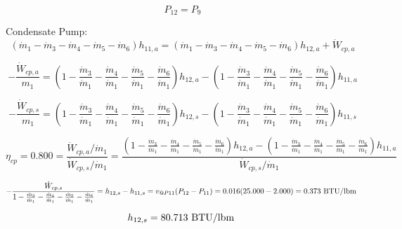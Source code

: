 \documentclass{article}
\begin{document}
\begin{equation}
P_{12} = P_{ 9}
\end{equation}


Condensate Pump:
\begin{equation}
(\dot{m}_{ 1} - \dot{m}_{ 3} - \dot{m}_{ 4} - \dot{m}_{ 5} - \dot{m}_{ 6})h_{11,a} = (\dot{m}_{ 1} - \dot{m}_{ 3} - \dot{m}_{ 4} - \dot{m}_{ 5} - \dot{m}_{ 6})h_{12,a} + \dot{W}_{cp ,a}
\end{equation}

\begin{equation}
-\frac{\dot{W}_{cp ,a}}{m_1} = (1 - \frac{\dot{m}_{ 3}}{\dot{m}_{ 1}} - \frac{\dot{m}_{ 4}}{\dot{m}_{ 1}} - \frac{\dot{m}_{ 5}}{\dot{m}_{ 1}} - \frac{\dot{m}_{ 6}}{\dot{m}_{ 1}})h_{12,a} - (1 - \frac{\dot{m}_{ 3}}{\dot{m}_{ 1}} - \frac{\dot{m}_{ 4}}{\dot{m}_{ 1}} - \frac{\dot{m}_{ 5}}{\dot{m}_{ 1}} - \frac{\dot{m}_{ 6}}{\dot{m}_{ 1}})h_{11,a}\end{equation}

\begin{equation}
-\frac{\dot{W}_{cp ,s}}{m_1} = (1 - \frac{\dot{m}_{ 3}}{\dot{m}_{ 1}} - \frac{\dot{m}_{ 4}}{\dot{m}_{ 1}} - \frac{\dot{m}_{ 5}}{\dot{m}_{ 1}} - \frac{\dot{m}_{ 6}}{\dot{m}_{ 1}})h_{12,s} - (1 - \frac{\dot{m}_{ 3}}{\dot{m}_{ 1}} - \frac{\dot{m}_{ 4}}{\dot{m}_{ 1}} - \frac{\dot{m}_{ 5}}{\dot{m}_{ 1}} - \frac{\dot{m}_{ 6}}{\dot{m}_{ 1}})h_{11,s}\end{equation}

\begin{equation}
\eta_{cp } =    0.800 = \frac{\dot{W}_{cp ,a} / \dot{m}_{1}}{\dot{W}_{cp ,s} / \dot{m}_{1}} = \frac{
(1 - \frac{\dot{m}_{ 3}}{\dot{m}_{ 1}} - \frac{\dot{m}_{ 4}}{\dot{m}_{ 1}} - \frac{\dot{m}_{ 5}}{\dot{m}_{ 1}} - \frac{\dot{m}_{ 6}}{\dot{m}_{ 1}})h_{12,a} - (1 - \frac{\dot{m}_{ 3}}{\dot{m}_{ 1}} - \frac{\dot{m}_{ 4}}{\dot{m}_{ 1}} - \frac{\dot{m}_{ 5}}{\dot{m}_{ 1}} - \frac{\dot{m}_{ 6}}{\dot{m}_{ 1}})h_{11,a}}{\dot{W}_{cp ,s} / \dot{m}_{1}}
\end{equation}

\begin{equation}
-\frac{\dot{W}_{cp,s}}{1 - \frac{\dot{m}_{ 3}}{\dot{m}_{ 1}} - \frac{\dot{m}_{ 4}}{\dot{m}_{ 1}} - \frac{\dot{m}_{ 5}}{\dot{m}_{ 1}} - \frac{\dot{m}_{ 6}}{\dot{m}_{ 1}}} = h_{12,s} - h_{11,s} = v_{@P11}(P_{12} - P_{11}) =    0.016(  25.000 -    2.000) =    0.373\textnormal{ BTU/lbm                   }
\end{equation}

\begin{equation}
  h_{12,s} =   80.713\textnormal{ BTU/lbm                   }
\end{equation}
\end{document}
